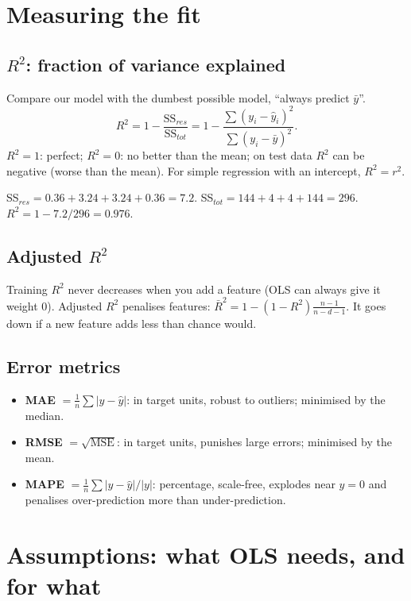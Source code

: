 \section{Measuring the fit}

\subsection{$R^2$: fraction of variance explained}
Compare our model with the dumbest possible model, ``always predict $\bar y$''.
\[ R^2 = 1 - \frac{\text{SS}_{res}}{\text{SS}_{tot}} = 1 - \frac{\sum(y_i - \hat y_i)^2}{\sum(y_i - \bar y)^2}. \]
$R^2 = 1$: perfect; $R^2 = 0$: no better than the mean; on test data $R^2$ can be negative (worse than the mean).
For simple regression with an intercept, $R^2 = r^2$.

\begin{example}
SS$_{res} = 0.36 + 3.24 + 3.24 + 0.36 = 7.2$. SS$_{tot} = 144+4+4+144 = 296$. $R^2 = 1 - 7.2/296 = 0.976$.
\end{example}

\subsection{Adjusted $R^2$}
Training $R^2$ never decreases when you add a feature (OLS can always give it weight 0). Adjusted $R^2$
penalises features: $\bar R^2 = 1 - (1-R^2)\frac{n-1}{n-d-1}$. It goes down if a new feature adds less than
chance would.

\subsection{Error metrics}
\begin{itemize}
\item \textbf{MAE} $=\frac1n\sum|y-\hat y|$: in target units, robust to outliers; minimised by the median.
\item \textbf{RMSE} $=\sqrt{\text{MSE}}$: in target units, punishes large errors; minimised by the mean.
\item \textbf{MAPE} $=\frac1n\sum|y-\hat y|/|y|$: percentage, scale-free, explodes near $y=0$ and penalises
  over-prediction more than under-prediction.
\end{itemize}

\section{Assumptions: what OLS needs, and for what}


